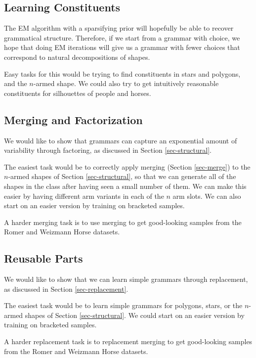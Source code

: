 
\subsection{Learning Constituents}

The EM algorithm with a sparsifying prior will hopefully be able to
recover grammatical structure. Therefore, if we start from a grammar
with choice, we hope that doing EM iterations will give us a grammar
with fewer choices that correspond to natural decompositions of
shapes.

Easy tasks for this would be trying to find constituents in stars and
polygons, and the $n$-armed shape. We could also try to get
intuitively reasonable constituents for silhouettes of people and
horses.

\subsection{Merging and Factorization}

We would like to show that grammars can capture an exponential amount
of variability through factoring, as discussed in Section
\ref{sec-structural}.

The easiest task would be to correctly apply merging (Section
\ref{sec-merge}) to the $n$-armed shapes of Section
\ref{sec-structural}, so that we can generate all of the shapes in the
class after having seen a small number of them. We can make this
easier by having different arm variants in each of the $n$ arm
slots. We can also start on an easier version by training on bracketed
samples.

A harder merging task is to use merging to get good-looking samples
from the Romer and Weizmann Horse datasets.

\subsection{Reusable Parts}

We would like to show that we can learn simple grammars through
replacement, as discussed in Section \ref{sec-replacement}.

The easiest task would be to learn simple grammars for polygons,
stars, or the $n$-armed shapes of Section \ref{sec-structural}. We
could start on an easier version by training on bracketed samples.

A harder replacement task is to replacement merging to get
good-looking samples from the Romer and Weizmann Horse datasets.

